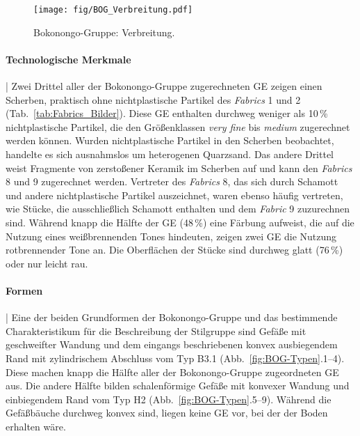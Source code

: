 \begin{figure*}[p]
	\centering
	\texttt{[image: fig/BOG\_Verbreitung.pdf]}
	\caption{Bokonongo-Gruppe: Verbreitung.}
	\label{fig:BOG_Verbreitung}
\end{figure*}

\paragraph{Technologische Merkmale}\hspace{-.5em}|\hspace{.5em}%
Zwei Drittel aller der Bokonongo-Gruppe zugerechneten GE zeigen einen Scherben, praktisch ohne nichtplastische Partikel des \textit{Fabrics} 1 und 2 (Tab.~\ref{tab:Fabrics_Bilder}). Diese GE enthalten durchweg weniger als 10\,\% nichtplastische Partikel, die den Größenklassen \textit{very fine} bis \textit{medium} zugerechnet werden können. Wurden nichtplastische Partikel in den Scherben beobachtet, handelte es sich ausnahmslos um heterogenen Quarzsand. Das andere Drittel weist Fragmente von zerstoßener Keramik im Scherben auf und kann den \textit{Fabrics} 8 und 9 zugerechnet werden. Vertreter des \textit{Fabrics} 8, das sich durch Schamott und andere nichtplastische Partikel auszeichnet, waren ebenso häufig vertreten, wie Stücke, die ausschließlich Schamott enthalten und dem \textit{Fabric} 9 zuzurechnen sind. Während knapp die Hälfte der GE (48\,\%) eine Färbung aufweist, die auf die Nutzung eines weißbrennenden Tones hindeuten, zeigen zwei GE die Nutzung rotbrennender Tone an. Die Oberflächen der Stücke sind durchweg glatt (76\,\%) oder nur leicht rau.

\paragraph{Formen}\hspace{-.5em}|\hspace{.5em}%
Eine der beiden Grundformen der Bokonongo-Gruppe und das bestimmende Charakteristikum für die Beschreibung der Stilgruppe sind Gefäße mit geschweifter Wandung und dem eingangs beschriebenen konvex ausbiegendem Rand mit zylindrischem Abschluss vom Typ B3.1 (Abb.~\ref{fig:BOG-Typen}.1--4). Diese machen knapp die Hälfte aller der Bokonongo-Gruppe zugeordneten GE aus. Die andere Hälfte bilden schalenförmige Gefäße mit konvexer Wandung und einbiegendem Rand vom Typ H2 (Abb.~\ref{fig:BOG-Typen}.5--9). Während die Gefäßbäuche durchweg konvex sind, liegen keine GE vor, bei der der Boden erhalten wäre.

